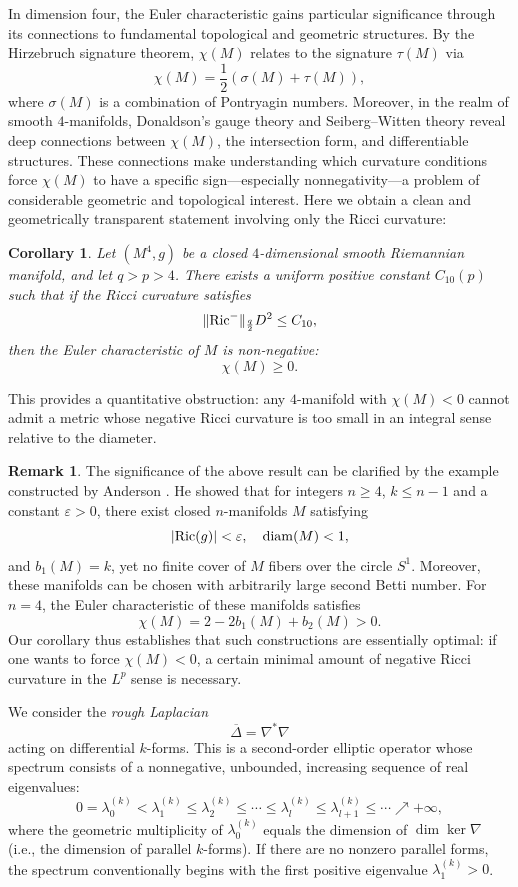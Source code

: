 \documentclass[12pt, twoside]{article}
\newtheorem{corollary}[theorem]{Corollary}
\theoremstyle{definition}
\newtheorem{remark}[theorem]{Remark}
\numberwithin{equation}{section}
\def \De {\Delta}
\def \la {\lambda}
\def\na {\nabla}
\begin{document}
In dimension four, the Euler characteristic gains particular significance through its connections to fundamental topological and geometric structures. By the Hirzebruch signature theorem, $\chi(M)$ relates to the signature $\tau(M)$ via 
$$\chi(M)=\frac{1}{2}(\sigma(M)+\tau(M)),$$ 
where $\sigma(M)$ is a combination of Pontryagin numbers. Moreover, in the realm of smooth $4$-manifolds, Donaldson's gauge theory \cite{Donaldson1983,Donaldson1987} and Seiberg--Witten theory \cite{Witten1994} reveal deep connections between $\chi(M)$, the intersection form, and differentiable structures. These connections make understanding which curvature conditions force $\chi(M)$ to have a specific sign---especially nonnegativity---a problem of considerable geometric and topological interest. Here we obtain a clean and geometrically transparent statement involving only the Ricci curvature:
\begin{corollary}
	\label{cor:4dim}
	Let $(M^{4},g)$ be a closed $4$-dimensional smooth Riemannian manifold, and let $q>p>4$. There exists a uniform positive constant $C_{10}(p)$ such that if the Ricci curvature satisfies 
	$$\|{\rm Ric}^{-}\|_{\frac{q}{2}}D^{2}\leq C_{10},$$
	then the Euler characteristic of $M$ is non‑negative:
	\[\chi(M)\geq 0.\]
\end{corollary}
This provides a quantitative obstruction: any $4$-manifold with $\chi(M)<0$ cannot admit a metric whose negative Ricci curvature is too small in an integral sense relative to the diameter. 
\begin{remark}
The significance of the above result can be clarified by the example constructed by Anderson \cite{Anderson1992}. He showed that for integers $n\geq 4$, $k\leq n-1$ and a constant $\varepsilon>0$, there exist closed $n$-manifolds $M$ satisfying 
$$|{\rm Ric}(g)|<\varepsilon,\quad{\rm diam}(M)<1,$$ and 
$b_{1}(M)=k$, yet no finite cover of $M$ fibers over the circle $S^{1}$. Moreover, these manifolds can be chosen with arbitrarily large second Betti number. For $n=4$, the Euler characteristic of these manifolds satisfies $$\chi(M)=2-2b_{1}(M)+b_{2}(M)>0.$$ 
Our corollary thus establishes that such constructions are essentially optimal: if one wants to force $\chi(M)<0$, a certain minimal amount of negative Ricci curvature in the $L^p$ sense is necessary.
\end{remark}
We consider the \textit{rough Laplacian} 
$$\overline{\De}=\na^{\ast}\na$$
acting on differential $k$-forms.  This is a second-order elliptic operator whose spectrum consists of a nonnegative, unbounded, 
increasing sequence of real eigenvalues: 
$$0=\la^{(k)}_{0}<\la^{(k)}_{1}\leq\la^{(k)}_{2}\leq\cdots\leq\la^{(k)}_{l}\leq\la^{(k)}_{l+1}\leq\cdots\nearrow+\infty,$$
where the geometric multiplicity of $\la^{(k)}_{0}$ equals the dimension of $\dim\ker\na$ (i.e., the dimension of parallel $k$-forms). 
If there are no nonzero parallel forms, the spectrum conventionally begins with the first positive eigenvalue $\la^{(k)}_{1}>0$.
\end{document}
